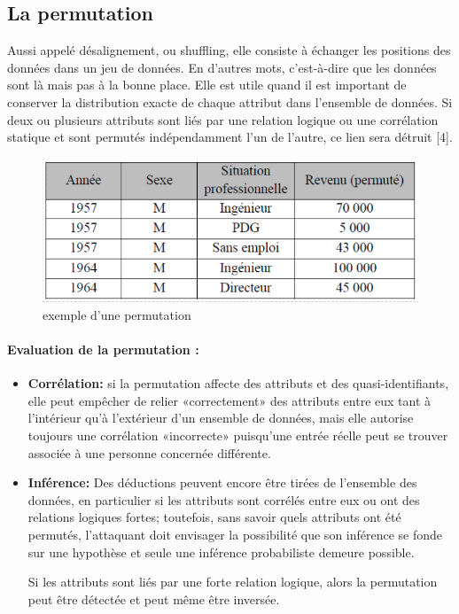 \subsection{La permutation}
Aussi appelé désalignement, ou shuffling, elle consiste à échanger les positions des données dans un jeu de données. En d’autres mots, c’est-à-dire que les données sont là mais pas à la bonne place. Elle est utile quand il est important de conserver la distribution exacte de chaque attribut dans l’ensemble de données. Si deux ou plusieurs attributs sont liés par une relation logique ou une corrélation statique et sont permutés indépendamment l’un de l’autre, ce lien sera détruit [4]. 

\begin{figure}[!h]
    \centering
    \includegraphics[width=1\textwidth]{images/anonymisation/permutation_image1.png}
    \caption{exemple d'une permutation}
    \label{exemple d'une permutation}
\end{figure}
\paragraph{Evaluation de la permutation : }
\begin{itemize}
    \item \textbf{Corrélation:} si la permutation affecte des attributs et des quasi-identifiants, elle peut empêcher de relier «correctement» des attributs entre eux tant à l’intérieur qu’à l’extérieur d’un ensemble de données, mais elle autorise toujours une corrélation «incorrecte» puisqu’une entrée réelle peut se trouver associée à une personne concernée différente. 

    \item \textbf{Inférence:} Des déductions peuvent encore être tirées de l’ensemble des données, en particulier si les attributs sont corrélés entre eux ou ont des relations logiques fortes; toutefois, sans savoir quels attributs ont été permutés, l’attaquant doit envisager la possibilité que son inférence se fonde sur une hypothèse et seule une inférence probabiliste demeure possible. 

Si les attributs sont liés par une forte relation logique, alors la permutation peut être détectée et peut même être inversée. 
\end{itemize}
